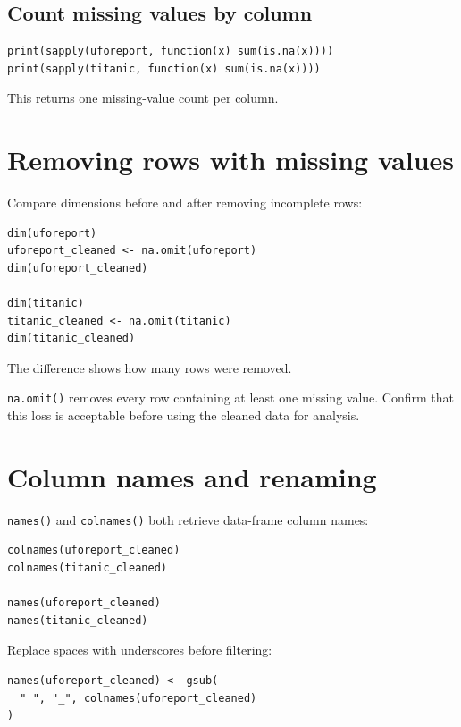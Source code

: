 \subsection{Count missing values by column}

\begin{lstlisting}[style=dsr]
print(sapply(uforeport, function(x) sum(is.na(x))))
print(sapply(titanic, function(x) sum(is.na(x))))
\end{lstlisting}

This returns one missing-value count per column.

\section{Removing rows with missing values}

Compare dimensions before and after removing incomplete rows:

\begin{lstlisting}[style=dsr]
dim(uforeport)
uforeport_cleaned <- na.omit(uforeport)
dim(uforeport_cleaned)

dim(titanic)
titanic_cleaned <- na.omit(titanic)
dim(titanic_cleaned)
\end{lstlisting}

The difference shows how many rows were removed.

\begin{pitfall}
\texttt{na.omit()} removes every row containing at least one missing value. Confirm that this loss is acceptable before using the cleaned data for analysis.
\end{pitfall}

\section{Column names and renaming}

\texttt{names()} and \texttt{colnames()} both retrieve data-frame column names:

\begin{lstlisting}[style=dsr]
colnames(uforeport_cleaned)
colnames(titanic_cleaned)

names(uforeport_cleaned)
names(titanic_cleaned)
\end{lstlisting}

Replace spaces with underscores before filtering:

\begin{lstlisting}[style=dsr]
names(uforeport_cleaned) <- gsub(
  " ", "_", colnames(uforeport_cleaned)
)
\end{lstlisting}

